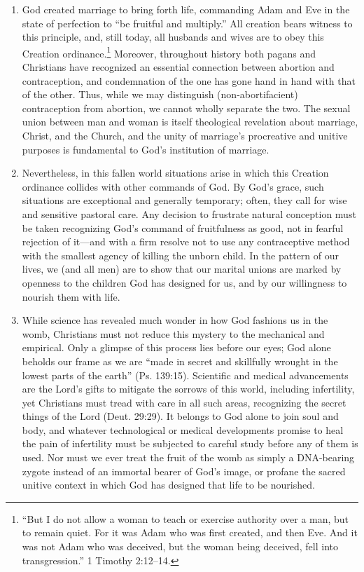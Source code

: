 \documentclass[
]{book}
\begin{document}
\begin{enumerate}
\item
  God created marriage to bring forth life, commanding Adam and Eve in the state of perfection to ``be fruitful and multiply.'' All creation bears witness to this principle, and, still today, all husbands and wives are to obey this Creation ordinance.\footnote{``But I do not allow a woman to teach or exercise authority over a man, but to remain quiet. For it was Adam who was first created, and then Eve. And it was not Adam who was deceived, but the woman being deceived, fell into transgression.'' 1 Timothy 2:12--14.} Moreover, throughout history both pagans and Christians have recognized an essential connection between abortion and contraception, and condemnation of the one has gone hand in hand with that of the other. Thus, while we may distinguish (non-abortifacient) contraception from abortion, we cannot wholly separate the two. The sexual union between man and woman is itself theological revelation about marriage, Christ, and the Church, and the unity of marriage's procreative and unitive purposes is fundamental to God's institution of marriage.
\item
  Nevertheless, in this fallen world situations arise in which this Creation ordinance collides with other commands of God. By God's grace, such situations are exceptional and generally temporary; often, they call for wise and sensitive pastoral care. Any decision to frustrate natural conception must be taken recognizing God's command of fruitfulness as good, not in fearful rejection of it---and with a firm resolve not to use any contraceptive method with the smallest agency of killing the unborn child. In the pattern of our lives, we (and all men) are to show that our marital unions are marked by openness to the children God has designed for us, and by our willingness to nourish them with life.
\item
  While science has revealed much wonder in how God fashions us in the womb, Christians must not reduce this mystery to the mechanical and empirical. Only a glimpse of this process lies before our eyes; God alone beholds our frame as we are ``made in secret and skillfully wrought in the lowest parts of the earth'' (Ps. 139:15). Scientific and medical advancements are the Lord's gifts to mitigate the sorrows of this world, including infertility, yet Christians must tread with care in all such areas, recognizing the secret things of the Lord (Deut. 29:29). It belongs to God alone to join soul and body, and whatever technological or medical developments promise to heal the pain of infertility must be subjected to careful study before any of them is used. Nor must we ever treat the fruit of the womb as simply a DNA-bearing zygote instead of an immortal bearer of God's image, or profane the sacred unitive context in which God has designed that life to be nourished.

\end{enumerate}
\end{document}
